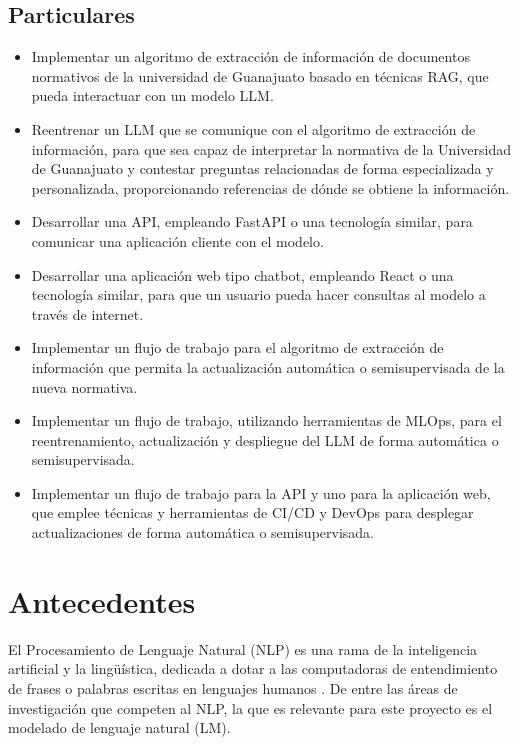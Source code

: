 \subsection{Particulares}

\begin{itemize}
    \item Implementar un algoritmo de extracción de información de documentos
          normativos de la universidad de Guanajuato basado en técnicas RAG, que
          pueda interactuar con un modelo LLM.
    \item Reentrenar un LLM que se comunique con el algoritmo de extracción de
          información, para que sea capaz de interpretar la normativa de la Universidad
          de Guanajuato y contestar preguntas relacionadas de forma especializada y
          personalizada, proporcionando referencias de dónde se obtiene la información.
    \item Desarrollar una API, empleando FastAPI o una tecnología similar,
          para comunicar una aplicación cliente con el modelo.
    \item Desarrollar una aplicación web tipo chatbot, empleando React o una
          tecnología similar, para que un usuario pueda hacer consultas al modelo a
          través de internet.
    \item Implementar un flujo de trabajo para el algoritmo de extracción de
          información que permita la actualización automática o semisupervisada de
          la nueva normativa.
    \item Implementar un flujo de trabajo, utilizando herramientas de MLOps,
          para el reentrenamiento, actualización y despliegue del LLM de forma automática
          o semisupervisada.
    \item Implementar un flujo de trabajo para la API y uno para la aplicación
          web, que emplee técnicas y herramientas de CI/CD y DevOps para desplegar
          actualizaciones de forma automática o semisupervisada.
\end{itemize}


\section{Antecedentes}

El Procesamiento de Lenguaje Natural (NLP) es una rama de la inteligencia artificial
y la lingüística, dedicada a dotar a las computadoras de entendimiento de frases o
palabras escritas en lenguajes humanos \cite{khurana_natural_2023}. De entre las áreas
de investigación que competen al NLP, la que es relevante para este proyecto es
el modelado de lenguaje natural (LM).

